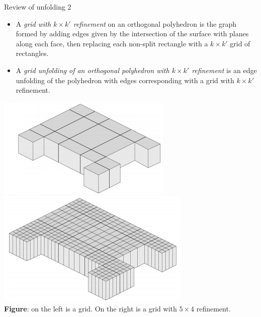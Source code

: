 \documentclass[handout]{beamer}
\theoremstyle{plain}
\begin{document}
  \begin{frame}{Review of unfolding 2}
    \begin{itemize}
      \item A \emph{grid with $k \times k'$ refinement} on an orthogonal polyhedron is the graph formed by adding edges given by the intersection of the surface with planes along each face, then replacing each non-split rectangle with a $k \times k'$ grid of rectangles.
      \pause \item A \emph{grid unfolding of an orthogonal polyhedron with $k \times k'$ refinement} is an edge unfolding of the polyhedron with edges corresponding with a grid with $k \times k'$ refinement. 
    \end{itemize}
    \begin{center}
    \includegraphics[width=.3\textwidth]{./figs/grid.png}
    \hspace{.1\textwidth}
    \includegraphics[width=.3\textwidth]{./figs/refined_grid.png}\\
    \tiny\textbf{Figure}: on the left is a grid. On the right is a grid with $5 \times 4$ refinement.
    \end{center}
  \end{frame}
\end{document}
